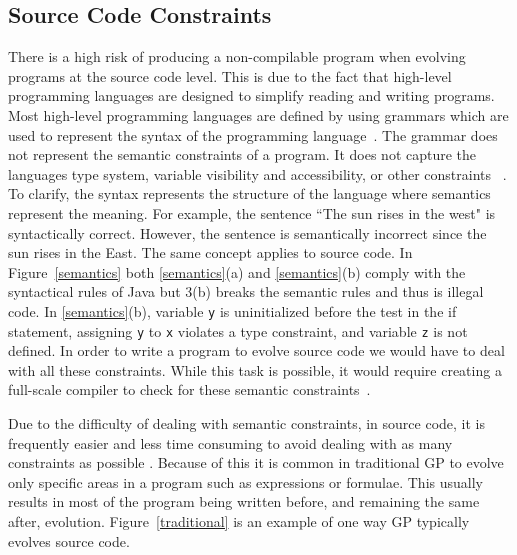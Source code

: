 \documentclass{sig-alternate}
\begin{document}
\subsection{Source Code Constraints}
There is a high risk of producing a non-compilable program when evolving programs at the source code level. This is due to the fact that high-level programming languages are designed to simplify reading and writing programs. Most high-level programming languages are defined by using grammars which are used to represent the syntax of the programming language~\cite{Oracle:2013,Assembly:2010}. The grammar does not represent the semantic constraints of a program. It does not capture the languages type system, variable visibility and accessibility, or other constraints ~\cite{FINCH:2011}. To clarify, the syntax represents the structure of the language where semantics represent the meaning.  For example, the sentence ``The sun rises in the west" is syntactically correct. However, the sentence is semantically incorrect since the sun rises in the East. The same concept applies to source code. In Figure~\ref{semantics} both \ref{semantics}(a) and \ref{semantics}(b) comply with the syntactical rules of Java but 3(b) breaks the semantic rules and thus is illegal code. In \ref{semantics}(b), variable \texttt{y} is uninitialized before the test in the if statement, assigning \texttt{y} to \texttt{x} violates a type constraint, and variable \texttt{z} is not defined. In order to write a program to evolve source code we would have to deal with all these constraints. While this task is possible, it would require creating a full-scale compiler to check for these semantic constraints~\cite{FINCH:2011}.\par

Due to the difficulty of dealing with semantic constraints, in source code, it is frequently easier and less time consuming to avoid dealing with as many constraints as possible . Because of this it is common in traditional GP to evolve only specific areas in a program such as expressions or formulae. This usually results in most of the program being written before, and remaining the same after, evolution. Figure~\ref{traditional} is an example of one way GP typically evolves source code.\par
\end{document}
